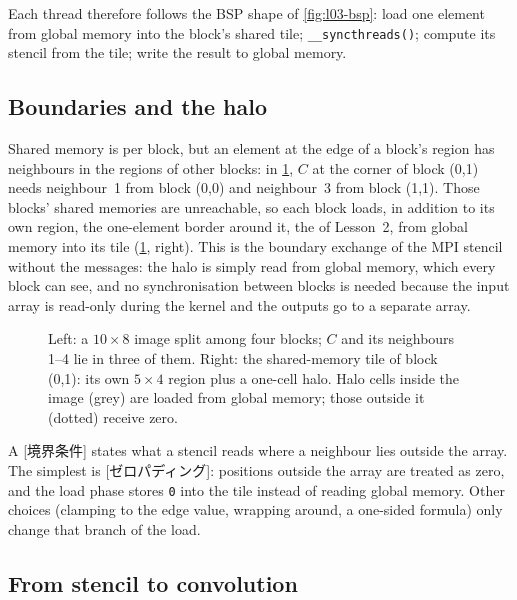\documentclass[../main.tex]{subfiles}
\begin{document}
Each thread therefore follows the BSP shape of \cref{fig:l03-bsp}: load
one element from global memory into the block's shared tile;
\texttt{\_\_syncthreads()}; compute its stencil from the tile; write the
result to global memory.

\subsection{Boundaries and the halo}

Shared memory is per block, but an element at the edge of a block's
region has neighbours in the regions of other blocks: in
\cref{fig:l03-stencil-tile}, $C$ at the corner of block (0,1) needs
neighbour~1 from block (0,0) and neighbour~3 from block (1,1).  Those
blocks' shared memories are unreachable, so each block loads, in addition
to its own region, the one-element border around it, the
 of Lesson~2, from global memory into its tile
(\cref{fig:l03-stencil-tile}, right).  This is the boundary exchange of
the MPI stencil without the messages: the halo is simply read from global
memory, which every block can see, and no synchronisation between blocks
is needed because the input array is read-only during the kernel and the
outputs go to a separate array.

\begin{figure}[tb]
  \centering
  
  \caption{Left: a $10\times8$ image split among four blocks; $C$ and its
    neighbours 1--4 lie in three of them.  Right: the shared-memory tile
    of block (0,1): its own $5\times4$ region plus a one-cell halo.  Halo
    cells inside the image (grey) are loaded from global memory; those
    outside it (dotted) receive zero.}
  \label{fig:l03-stencil-tile}
\end{figure}

\begin{definition}
  A [境界条件] states what a stencil reads where
  a neighbour lies outside the array.  The simplest is
  [ゼロパディング]: positions outside the array are
  treated as zero, and
  the load phase stores \texttt{0} into the tile instead of reading
  global memory.  Other choices (clamping to the edge value, wrapping
  around, a one-sided formula) only change that branch of the load.
\end{definition}

\subsection{From stencil to convolution}
\end{document}
